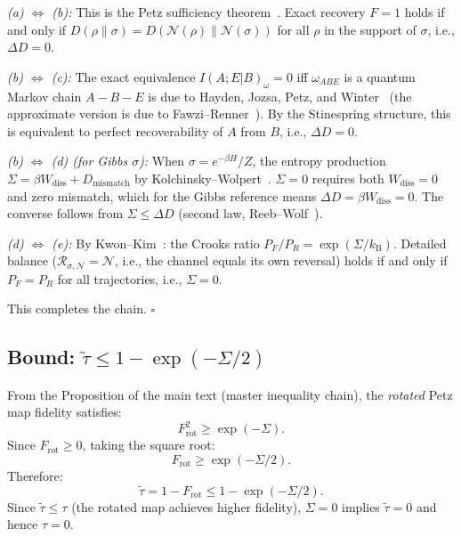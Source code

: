 \documentclass[prl,twocolumn,superscriptaddress,longbibliography]{revtex4-2}
\newcommand{\kB}{k_{\mathrm{B}}}
\newcommand{\Petz}{\mathcal{R}}
\newcommand{\chan}{\mathcal{N}}
\newcommand{\tauasym}{\tau}
\newcommand{\taurot}{\tilde{\tau}}
\begin{document}
\emph{(a) $\Leftrightarrow$ (b):} This is the Petz sufficiency
theorem~\cite{Petz1988}. Exact recovery $F = 1$ holds if and only if
$D(\rho\|\sigma) = D(\chan(\rho)\|\chan(\sigma))$ for all $\rho$ in
the support of $\sigma$, i.e., $\Delta D = 0$.

\emph{(b) $\Leftrightarrow$ (c):} The exact equivalence
$I(A;E|B)_\omega = 0$ iff $\omega_{ABE}$ is a quantum
Markov chain $A - B - E$ is due to Hayden, Jozsa, Petz, and
Winter~\cite{HJPW2004} (the approximate version is due to
Fawzi--Renner~\cite{Fawzi2015}). By the Stinespring structure,
this is equivalent to perfect recoverability of $A$ from $B$,
i.e., $\Delta D = 0$.

\emph{(b) $\Leftrightarrow$ (d) (for Gibbs $\sigma$):} When $\sigma =
e^{-\beta H}/Z$, the entropy production $\Sigma = \beta W_{\mathrm{diss}}
+ D_{\mathrm{mismatch}}$ by Kolchinsky--Wolpert~\cite{Kolchinsky2017}.
$\Sigma = 0$ requires both $W_{\mathrm{diss}} = 0$ and zero mismatch,
which for the Gibbs reference means $\Delta D = \beta W_{\mathrm{diss}}
= 0$. The converse follows from $\Sigma \leq \Delta D$ (second
law, Reeb--Wolf~\cite{ReebWolf2014}).

\emph{(d) $\Leftrightarrow$ (e):} By Kwon--Kim~\cite{Kwon2019}:
the Crooks ratio $P_F/P_R = \exp(\Sigma/\kB)$. Detailed balance
($\Petz_{\sigma,\chan} = \chan$, i.e., the channel equals its own
reversal) holds if and only if $P_F = P_R$ for all trajectories, i.e.,
$\Sigma = 0$.

This completes the chain. \hfill$\square$

\subsection{Bound: $\taurot \leq 1 - \exp(-\Sigma/2)$}

From the Proposition of the main text (master inequality chain),
the \emph{rotated} Petz map fidelity satisfies:
\begin{equation}
F_{\mathrm{rot}}^2 \geq \exp(-\Sigma).
\end{equation}
Since $F_{\mathrm{rot}} \geq 0$, taking the square root:
\begin{equation}
F_{\mathrm{rot}} \geq \exp(-\Sigma/2).
\end{equation}
Therefore:
\begin{equation}
\taurot = 1 - F_{\mathrm{rot}} \leq 1 - \exp(-\Sigma/2).
\end{equation}
Since $\taurot \leq \tauasym$ (the rotated map achieves higher
fidelity), $\Sigma = 0$ implies $\taurot = 0$ and hence
$\tauasym = 0$.
\end{document}
